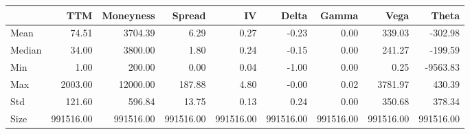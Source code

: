 \begin{tabular}{lrrrrrrrr}
\toprule
 & TTM & Moneyness & Spread & IV & Delta & Gamma & Vega & Theta \\
\midrule
Mean & 74.51 & 3704.39 & 6.29 & 0.27 & -0.23 & 0.00 & 339.03 & -302.98 \\
Median & 34.00 & 3800.00 & 1.80 & 0.24 & -0.15 & 0.00 & 241.27 & -199.59 \\
Min & 1.00 & 200.00 & 0.00 & 0.04 & -1.00 & 0.00 & 0.25 & -9563.83 \\
Max & 2003.00 & 12000.00 & 187.88 & 4.80 & -0.00 & 0.02 & 3781.97 & 430.39 \\
Std & 121.60 & 596.84 & 13.75 & 0.13 & 0.24 & 0.00 & 350.68 & 378.34 \\
Size & 991516.00 & 991516.00 & 991516.00 & 991516.00 & 991516.00 & 991516.00 & 991516.00 & 991516.00 \\
\bottomrule
\end{tabular}

